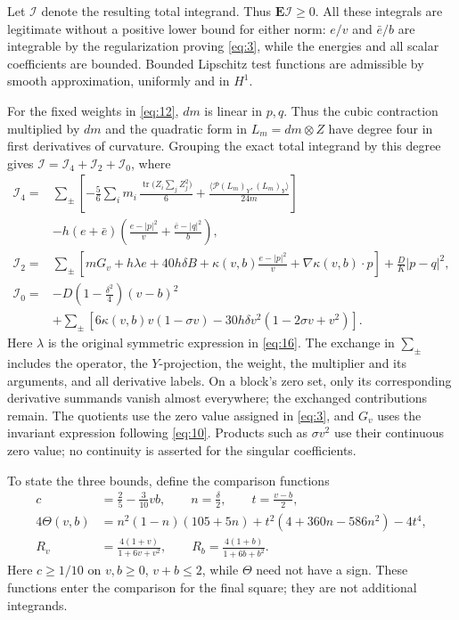 Let $\mathcal I$ denote the resulting total integrand. Thus
$\mathbf E\mathcal I\ge0$. All these integrals are legitimate without
a positive lower bound for either norm: $e/v$ and $\bar e/b$ are
integrable by the regularization proving \eqref{eq:3}, while the energies
and all scalar coefficients are bounded. Bounded Lipschitz test functions
are admissible by smooth approximation, uniformly and in $H^1$.

For the fixed weights in \eqref{eq:12}, $dm$ is linear in $p,q$.
Thus the cubic contraction multiplied by $dm$ and the quadratic form
in $L_m=dm\otimes Z$ have degree four in first derivatives of curvature.
Grouping the exact total integrand by this degree gives
$\mathcal I=\mathcal I_4+\mathcal I_2+\mathcal I_0$, where
\[
\begin{aligned}
\mathcal I_4={}&
 \sum_\pm\left[
 -\frac56\sum_i m_i\,
   \frac{\operatorname{tr}\bigl(Z_i\sum_j Z_j^2\bigr)}6
 +\frac{\langle\mathcal P(L_m)_Y,(L_m)_Y\rangle}{24m}
 \right]\\
 &-h(e+\bar e)
 \left(\frac{e-|p|^2}{v}+\frac{\bar e-|q|^2}{b}\right),\\[1mm]
\mathcal I_2={}&
 \sum_\pm\left[
 mG_v+h\lambda e+40h\delta B
 +\kappa(v,b)\frac{e-|p|^2}{v}
 +\nabla\kappa(v,b)\cdot p
 \right]
 +\frac DK|p-q|^2,\\[1mm]
\mathcal I_0={}&
 -D\left(1-\frac{\delta^2}{4}\right)(v-b)^2\\
 &+\sum_\pm\left[
 6\kappa(v,b)v(1-\sigma v)
 -30h\delta v^2(1-2\sigma v+v^2)
 \right].
\end{aligned}
\]
Here $\lambda$ is the original symmetric expression in \eqref{eq:16}.
The exchange in $\sum_\pm$ includes the operator, the $Y$-projection,
the weight, the multiplier and its arguments, and all derivative labels.
On a block's zero set, only its corresponding derivative summands vanish
almost everywhere; the exchanged contributions remain. The quotients
use the zero value assigned in \eqref{eq:3}, and $G_v$ uses the invariant
expression following \eqref{eq:10}. Products such as $\sigma v^2$ use their continuous
zero value; no continuity is asserted for the singular coefficients.

To state the three bounds, define the comparison functions
\[
\begin{aligned}
 c&=\frac25-\frac3{10}vb,\qquad
 n=\frac\delta2,\qquad t=\frac{v-b}{2},\\
 4\Theta(v,b)&=n^2(1-n)(105+5n)
       +t^2(4+360n-586n^2)-4t^4,\\
 R_v&=\frac{4(1+v)}{1+6v+v^2},\qquad
 R_b=\frac{4(1+b)}{1+6b+b^2}.
\end{aligned}
\]
Here $c\ge1/10$ on $v,b\ge0$, $v+b\le2$, while $\Theta$ need not
have a sign. These functions enter the comparison for the final square;
they are not additional integrands.

